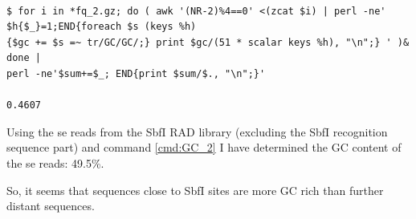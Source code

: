 \documentclass[a4paper,12pt,times,print,index, custombib]{PhDThesisPSnPDF}\usepackage[]{graphicx}\usepackage[]{color}
\begin{document}
\begin{cmd}
\begin{Verbatim}[formatcom=\color{darkgray}, fontsize=\scriptsize]

$ for i in *fq_2.gz; do ( awk '(NR-2)%4==0' <(zcat $i) | perl -ne' $h{$_}=1;END{foreach $s (keys %h)
{$gc += $s =~ tr/GC/GC/;} print $gc/(51 * scalar keys %h), "\n";} ' )& done | 
perl -ne'$sum+=$_; END{print $sum/$., "\n";}'

0.4607
\end{Verbatim}
\caption[Determine GC content from standard RAD PE reads]{For each individual, this command takes the \glspl{pe} reads, uniques them and determines their overall GC content. Finally, the average of the individual GC contents is taken. Note the brute-force parallelisation by sending each iteration of the \texttt{for} loop into the background with \texttt{(\ldots )\&}.}
\label{cmd:GC_1}
\end{cmd}

Using the \gls{se} reads from the \gls{SbfI} RAD library (excluding the SbfI recognition sequence part) and command \ref{cmd:GC_2} I have determined the GC content of the \gls{se} reads: 49.5\%.

\begin{cmd}
\caption[Determine GC content of \gls{se} reads]{This command is a different version of command \ref{cmd:GC_1}. However, it is used here to determine the GC content of all \gls{se} reads from the standard \gls{SbfI} RAD library. It first creates and exports two functions, \texttt{gc} and \texttt{mean}, and then uses the programme \texttt{parallel} in order to parallelise the determination of GC content over 10 cores. After stripping barcode and the remainder of the restriction site, the reads are 40 base pairs long. Note, the space between \{ and \texttt{awk} (line 1) as well as \{ and \texttt{perl} (line 4) is required.}
\label{cmd:GC_2}
\end{cmd}

So, it seems that sequences close to \gls{SbfI} sites are more GC rich than further distant sequences. 
\end{document}

